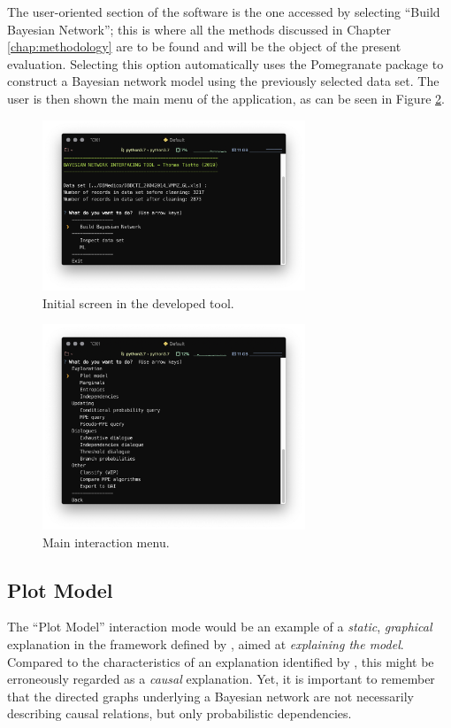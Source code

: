 The user-oriented section of the software is the one accessed by selecting \enquote{Build Bayesian Network}; this is where all the methods discussed in Chapter \ref{chap:methodology} are to be found and will be the object of the present evaluation.
Selecting this option automatically uses the Pomegranate package to construct a Bayesian network model using the previously selected data set.
The user is then shown the main menu of the application, as can be seen in Figure \ref{fig:sw_1}.

\begin{figure}[htbp]
\centerline{\includegraphics[width=0.7\textwidth]{results/images/sw_0}}
\caption{Initial screen in the developed tool.}
\label{fig:sw_0}
\end{figure}

\begin{figure}[htbp]
\centerline{\includegraphics[width=0.7\textwidth]{results/images/sw_1}}
\caption{Main interaction menu.}
\label{fig:sw_1}
\end{figure}

\subsection{Plot Model}
The \enquote{Plot Model} interaction mode would be an example of a \textit{static}, \textit{graphical} explanation in the framework defined by \citet{lacave2002review}, aimed at \textit{explaining the model}.
Compared to the characteristics of an explanation identified by \citet{miller2018explanation}, this might be erroneously regarded as a \textit{causal} explanation. 
Yet, it is important to remember that the directed graphs underlying a Bayesian network are not necessarily describing causal relations, but only probabilistic dependencies.

